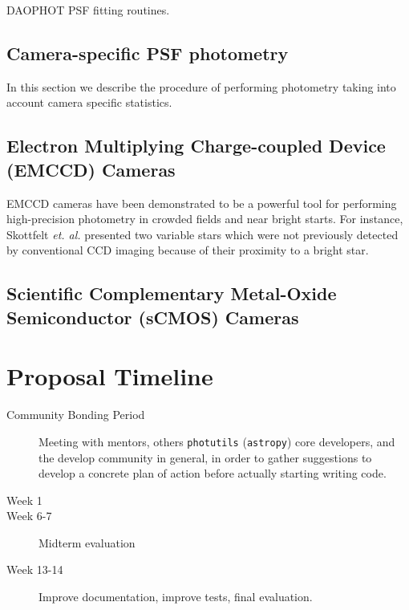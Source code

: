 \documentclass[11pt]{article}
\begin{document}
DAOPHOT PSF fitting routines.

\subsection{Camera-specific PSF photometry}

In this section we describe the procedure of performing photometry taking into account camera specific statistics.

\subsection{Electron Multiplying Charge-coupled Device (EMCCD) Cameras}
EMCCD cameras have been demonstrated to be a powerful tool for performing high-precision photometry in crowded fields and near bright starts. For instance, Skottfelt \textit{et. al.} presented two variable stars which were not previously detected by conventional CCD imaging because of their proximity to a bright star.




\subsection{Scientific Complementary Metal-Oxide Semiconductor (sCMOS) Cameras}


\section{Proposal Timeline}
\begin{description}
    \item[Community Bonding Period] Meeting with mentors, others \texttt{photutils} (\texttt{astropy}) core developers, and the develop community in general, in order to gather suggestions to develop a concrete plan of action before actually starting writing code.
    \item[Week 1]
    \item[Week 6-7] Midterm evaluation
    \item[Week 13-14] Improve documentation, improve tests, final evaluation.
\end{description}
\end{document}
